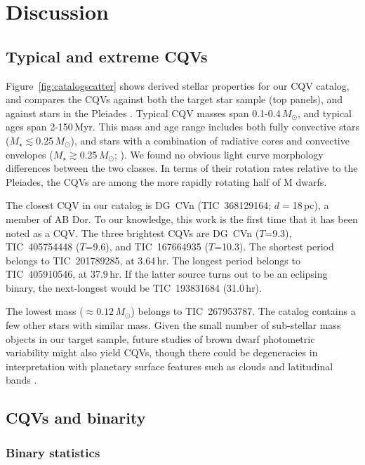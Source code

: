 \documentclass[11pt,twocolumn,tighten]{aastex63}
\begin{document}
\section{Discussion}
\label{sec:discussion}


\subsection{Typical and extreme CQVs}
\label{subsec:extreme}

Figure~\ref{fig:catalogscatter} shows derived stellar properties for
our CQV catalog, and compares the CQVs against both the target star
sample (top panels), and against stars in the Pleiades
\citep{2016AJ....152..114R}.  Typical CQV masses span
0.1-0.4\,$M_\odot$, and typical ages span 2-150\,Myr.  This mass and
age range includes both fully convective stars
($M_\star$$\lesssim$0.25\,$M_\odot$), and stars with a combination of
radiative cores and convective envelopes
($M_\star$$\gtrsim$0.25\,$M_\odot$; \citealt{2018A&A...619A.177B}).
We found no obvious light curve morphology differences between the two
classes.  In terms of their rotation rates relative to the Pleiades,
the CQVs are among the more rapidly rotating half of M dwarfs. 

The closest CQV in our catalog is DG~CVn (TIC~368129164;
$d$$=$18\,pc), a member of AB Dor.  To our knowledge, this work is the
first time that it has been noted as a CQV.  The three brightest CQVs
are DG~CVn ($T$=9.3), TIC~405754448 ($T$=9.6), and TIC~167664935
($T$=10.3).  The shortest period belongs to TIC~201789285, at
3.64\,hr.  The longest period belongs to TIC~405910546, at 37.9\,hr.
If the latter source turns out to be an eclipsing binary, the
next-longest would be TIC~193831684 (31.0\,hr).

The lowest mass ($\approx$$0.12$\,$M_\odot$) belongs to TIC~267953787.
The catalog contains a few other stars with similar mass.  Given the
small number of sub-stellar mass objects in our target sample, future
studies of brown dwarf photometric variability might also yield CQVs,
though there could be degeneracies in interpretation with planetary
surface features such as clouds and latitudinal bands
\citep[e.g.][]{2021ApJ...906...64A,2022ApJ...924...68V}.


\subsection{CQVs and binarity}
\label{subsec:discbinary}

\subsubsection{Binary statistics}
\end{document}

